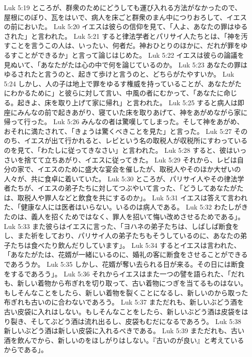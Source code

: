 Luk 5:19  ところが、群衆のためにどうしても運び入れる方法がなかったので、屋根にのぼり、瓦をはいで、病人を床ごと群衆のまん中につりおろして、イエスの前においた。
Luk 5:20  イエスは彼らの信仰を見て、「人よ、あなたの罪はゆるされた」と言われた。
Luk 5:21  すると律法学者とパリサイ人たちとは、「神を汚すことを言うこの人は、いったい、何者だ。神おひとりのほかに、だれが罪をゆるすことができるか」と言って論じはじめた。
Luk 5:22  イエスは彼らの論議を見ぬいて、「あなたがたは心の中で何を論じているのか。
Luk 5:23  あなたの罪はゆるされたと言うのと、起きて歩けと言うのと、どちらがたやすいか。
Luk 5:24  しかし、人の子は地上で罪をゆるす権威を持っていることが、あなたがたにわかるために」と彼らに対して言い、中風の者にむかって、「あなたに命じる。起きよ、床を取り上げて家に帰れ」と言われた。
Luk 5:25  すると病人は即座にみんなの前で起きあがり、寝ていた床を取りあげて、神をあがめながら家に帰って行った。
Luk 5:26  みんなの者は驚嘆してしまった。そして神をあがめ、おそれに満たされて、「きょうは驚くべきことを見た」と言った。
Luk 5:27  そののち、イエスが出て行かれると、レビという名の取税人が収税所にすわっているのを見て、「わたしに従ってきなさい」と言われた。
Luk 5:28  すると、彼はいっさいを捨てて立ちあがり、イエスに従ってきた。
Luk 5:29  それから、レビは自分の家で、イエスのために盛大な宴会を催したが、取税人やそのほか大ぜいの人々が、共に食卓に着いていた。
Luk 5:30  ところが、パリサイ人やその律法学者たちが、イエスの弟子たちに対してつぶやいて言った、「どうしてあなたがたは、取税人や罪人などと飲食を共にするのか」。
Luk 5:31  イエスは答えて言われた、「健康な人には医者はいらない。いるのは病人である。
Luk 5:32  わたしがきたのは、義人を招くためではなく、罪人を招いて悔い改めさせるためである」。
Luk 5:33  また彼らはイエスに言った、「ヨハネの弟子たちは、しばしば断食をし、また祈をしており、パリサイ人の弟子たちもそうしているのに、あなたの弟子たちは食べたり飲んだりしています」。
Luk 5:34  するとイエスは言われた、「あなたがたは、花婿が一緒にいるのに、婚礼の客に断食をさせることができるであろうか。
Luk 5:35  しかし、花婿が奪い去られる日が来る。その日には断食をするであろう」。
Luk 5:36  それからイエスはまた一つの譬を語られた、「だれも、新しい着物から布ぎれを切り取って、古い着物につぎを当てるものはない。もしそんなことをしたら、新しい着物を裂くことになるし、新しいのから取った布ぎれも古いのに合わないであろう。
Luk 5:37  まただれも、新しいぶどう酒を古い皮袋に入れはしない。もしそんなことをしたら、新しいぶどう酒は皮袋をはり裂き、そしてぶどう酒は流れ出るし、皮袋もむだになるであろう。
Luk 5:38  新しいぶどう酒は新しい皮袋に入れるべきである。
Luk 5:39  まただれも、古い酒を飲んでから、新しいのをほしがりはしない。『古いのが良い』と考えているからである」。
